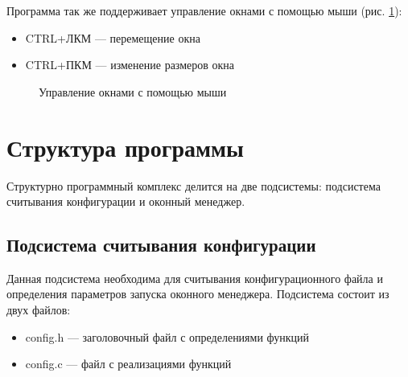 \documentclass[10pt,a4paper]{report}
\begin{document}
Программа так же поддерживает управление окнами с помощью мыши (рис. \ref{fig:wm4}):
\begin{itemize}
\item CTRL+ЛКМ --- перемещение окна
\item CTRL+ПКМ --- изменение размеров окна
\end{itemize}
\begin{figure}[h!]
\caption{Управление окнами с помощью мыши}
\label{fig:wm4}
\end{figure}

\section{Структура программы}
Структурно программный комплекс делится на две подсистемы: подсистема считывания конфигурации и оконный менеджер.
		
\subsection{Подсистема считывания конфигурации}
Данная подсистема необходима для считывания конфигурационного файла и определения параметров запуска оконного менеджера. Подсистема состоит из двух файлов:
\begin{itemize}
\item config.h --- заголовочный файл с определениями функций
\item config.c --- файл с реализациями функций
\end{itemize}
\end{document}
